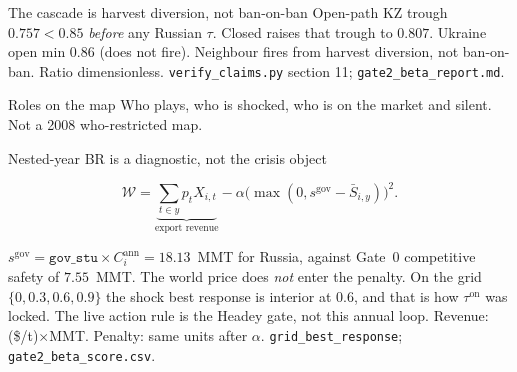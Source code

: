 \begin{frame}{The cascade is harvest diversion, not ban-on-ban}
{\scriptsize Open-path KZ trough $0.757<0.85$ \emph{before} any Russian
$\tau$. Closed raises that trough to $0.807$. Ukraine open min $0.86$
(does not fire). Neighbour fires from harvest diversion, not ban-on-ban.}
{Ratio dimensionless.}
{\texttt{verify\_claims.py} section 11; \texttt{gate2\_beta\_report.md}.}
\end{frame}

\begin{frame}{Roles on the map}
{\scriptsize Who plays, who is shocked, who is on the market and silent.
Not a 2008 who-restricted map.}
\end{frame}

\begin{frame}{Nested-year BR is a diagnostic, not the crisis object}

\[
\mathcal{W}
= \underbrace{\sum_{t\in y} p_t X_{i,t}}_{\text{export revenue}}
- \alpha \bigl(\max(0, s^{\mathrm{gov}}-\bar S_{i,y})\bigr)^2.
\]

$s^{\mathrm{gov}}=\mathtt{gov\_stu}\times C_i^{\mathrm{ann}}=18.13$~MMT for
Russia, against Gate~0 competitive safety of $7.55$~MMT. The world price
does \emph{not} enter the penalty. On the grid $\{0,0.3,0.6,0.9\}$ the
shock best response is interior at $0.6$, and that is how
$\tau^{\mathrm{on}}$ was locked. The live action rule is the Headey gate,
not this annual loop.
{Revenue: (\$/t)$\times$MMT. Penalty: same units after $\alpha$.}
{\texttt{grid\_best\_response}; \texttt{gate2\_beta\_score.csv}.}
\end{frame}

